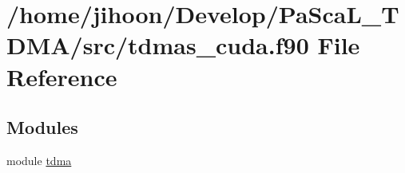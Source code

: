 \hypertarget{tdmas__cuda_8f90}{}\section{/home/jihoon/\+Develop/\+Pa\+Sca\+L\+\_\+\+T\+D\+M\+A/src/tdmas\+\_\+cuda.f90 File Reference}
\label{tdmas__cuda_8f90}
\subsection*{Modules}
\begin{DoxyCompactItemize}
\item 
module \hyperlink{namespacetdma}{tdma}
\end{DoxyCompactItemize}
